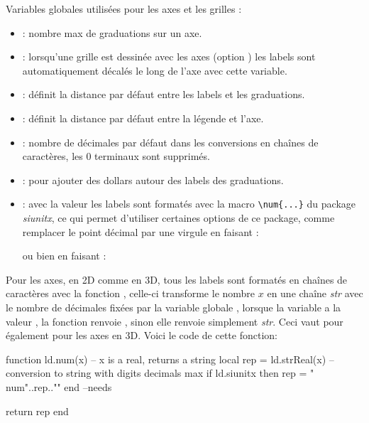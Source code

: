 Variables globales utilisées pour les axes et les grilles :
\begin{itemize}
    \item {} : nombre max de graduations sur un axe.
    \item {} : lorsqu'une grille est dessinée avec les axes (option ) les labels sont automatiquement décalés le long de l'axe avec cette variable.
    \item {} : définit la distance par défaut entre les labels et les graduations.
    \item {} : définit la distance par défaut entre la légende et l'axe.
    \item {} : nombre de décimales par défaut dans les conversions en chaînes de caractères, les $0$ terminaux sont supprimés.
    \item {} :  pour ajouter des dollars autour des labels des graduations.
    \item {} :  avec la valeur \true les labels sont formatés avec la macro \verb|\num{...}| du package \emph{siunitx}, ce qui permet d'utiliser certaines options de ce package, comme remplacer le point décimal par une virgule en faisant :\par
    \begin{TeXcode}
    \usepackage[local=FR]{siunitx}
    \end{TeXcode}
    ou bien en faisant :
    \begin{TeXcode}
    \usepackage{siunitx}
    \end{TeXcode}
\end{itemize}
Pour les axes, en 2D comme en 3D, tous les labels sont formatés en chaînes de caractères avec la fonction , celle-ci transforme le nombre $x$ en une chaîne \emph{str} avec le nombre de décimales fixées par la variable globale , lorsque la variable  a la valeur \true, la fonction renvoie , sinon elle renvoie simplement \emph{str}. Ceci vaut pour également pour les axes en 3D. Voici le code de cette fonction:
\begin{Luacode}
function ld.num(x) -- x is a real, returns a string
    local rep = ld.strReal(x) -- conversion to string with digits decimals max
    if ld.siunitx then rep = "\\num{"..rep.."}" end --needs \usepackage{siunitx}
    return rep
end
\end{Luacode}

